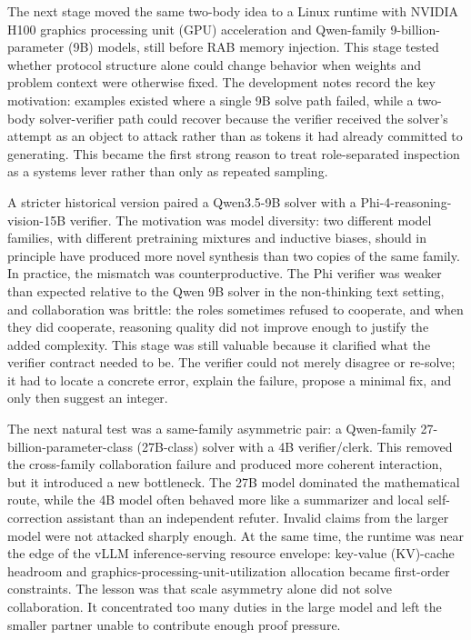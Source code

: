 \documentclass[11pt]{article}
\begin{document}
The next stage moved the same two-body idea to a Linux runtime with NVIDIA H100 graphics processing unit (GPU) acceleration and Qwen-family 9-billion-parameter (9B) models, still before RAB memory injection. This stage tested whether protocol structure alone could change behavior when weights and problem context were otherwise fixed. The development notes record the key motivation: examples existed where a single 9B solve path failed, while a two-body solver-verifier path could recover because the verifier received the solver's attempt as an object to attack rather than as tokens it had already committed to generating. This became the first strong reason to treat role-separated inspection as a systems lever rather than only as repeated sampling.

A stricter historical version paired a Qwen3.5-9B solver with a Phi-4-reasoning-vision-15B verifier. The motivation was model diversity: two different model families, with different pretraining mixtures and inductive biases, should in principle have produced more novel synthesis than two copies of the same family. In practice, the mismatch was counterproductive. The Phi verifier was weaker than expected relative to the Qwen 9B solver in the non-thinking text setting, and collaboration was brittle: the roles sometimes refused to cooperate, and when they did cooperate, reasoning quality did not improve enough to justify the added complexity. This stage was still valuable because it clarified what the verifier contract needed to be. The verifier could not merely disagree or re-solve; it had to locate a concrete error, explain the failure, propose a minimal fix, and only then suggest an integer.

The next natural test was a same-family asymmetric pair: a Qwen-family 27-billion-parameter-class (27B-class) solver with a 4B verifier/clerk. This removed the cross-family collaboration failure and produced more coherent interaction, but it introduced a new bottleneck. The 27B model dominated the mathematical route, while the 4B model often behaved more like a summarizer and local self-correction assistant than an independent refuter. Invalid claims from the larger model were not attacked sharply enough. At the same time, the runtime was near the edge of the vLLM inference-serving resource envelope: key-value (KV)-cache headroom and graphics-processing-unit-utilization allocation became first-order constraints. The lesson was that scale asymmetry alone did not solve collaboration. It concentrated too many duties in the large model and left the smaller partner unable to contribute enough proof pressure.
\end{document}
